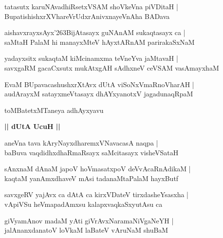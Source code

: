 \documentclass[twoside,12pt,openright]{book}
\def\S{\char'263}
\newcounter{shloka}[chapter]
\def\uvaca#1{\centerline{{\large\textbf{#1}}}}
\begin{document}
\begin{shloka}%
tatasutx karuNAvadhiRsetxVSAM shoVkeVna piVDitaH |\\
BupatishishxrXVhareVrUdxrAnivxnayeVnAha BADava 
\end{shloka}

\begin{shloka}%
aishavxrayxsAyx\S BijAtasayx guNAnAM sukaqtasayx ca |\\
saMtaH PalaM  hi manayxMteV hAyxtARnAM parirakaSxNaM 
\end{shloka}

\begin{shloka}%
yadayxsitx sukaqtaM kiMcinamxma teVneYva jaMtavaH |\\
savxgaRM gacaCxsutx mukAtxgAH sAdhxneV ceVSAM vasAmayxhaM 
\end{shloka}

\begin{shloka}%
EvaM BUpavacashushxrXtAvx dUtA viSoNxVmaRnoVharAH |\\
audArayxM satayxmeVtasayx dhAYxyanotxV jagadunaqRpaM 
\end{shloka}

\begin{center}
toMBatetxMTaneya adhAyxyavu 
\end{center} 

\uvaca{|| dUtA UcuH ||}

\begin{shloka}%
aneVna tava kAryNayxdharemxVNavacasA naqpa |\\
baBuva vaqdidhxdhaRmaRsayx saMcitasayx visheVSataH 
\end{shloka}

\begin{shloka}%
sAnxnaM dAnaM japoV hoVmasatxpoV deVvAcaRnAdikaM |\\
kaqtaM yanAmxdhaveV mAsi tadanaMtaPalaM hayxButf 
\end{shloka}

\begin{shloka}%
savxgeRV yajAvx ca dAtA ca kirxVDateV tirxdasheYsasxha |\\
vApiVSu heVmapadAmxsu kalapxvaqkaSxyutAsu ca 
\end{shloka}

\begin{shloka}%
giVyamAnov madaM yAti giVrAvxNaramaNiVgaNeYH |\\
jalAnanxdanatoV loVkaM laBateV vAruNaM shuBaM 
\end{shloka}
\end{document}

